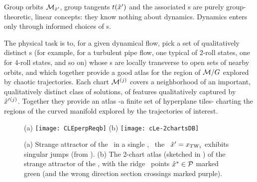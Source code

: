 \documentclass[aip,cha,reprint,
secnumarabic,
nofootinbib, tightenlines,
nobibnotes, showkeys, showpacs,
]{revtex4-1}
\begin{document}
{Group orbits ${\cal M}_{{\hat{x}'}}$, group tangents $t({\hat{x}'})$ and the
associated \slice s are purely group-theoretic, linear concepts: they
know nothing about dynamics. Dynamics enters only through informed
choices of \template s.

The physical task is to, for a given dynamical flow, pick a set of
qualitatively distinct {\template s} (for example, for a turbulent pipe
flow, one typical of 2-roll states, one for 4-roll states, and so on)
whose \slice s  are locally transverse to open sets of nearby orbits, and
which together provide a good atlas for the region of ${\cal M}/G$
explored by chaotic trajectories. Each chart ${\cal M}{}^{(j)}$ covers a
neighborhood of an important, qualitatively distinct class of solutions,
of features qualitatively captured by \template\ ${\hat{x}'}{}^{(j)}$.
Together they provide an atlas -a finite set of hyperplane tiles-
charting the regions of the curved manifold explored by the trajectories
of interest.

\begin{figure}
 \begin{center}
(a) \texttt{[image: CLEperpReqb]}
(b) \texttt{[image: cLe-2chartsDB]}
 \end{center}
  \caption{\label{fig:cLe-2charts}
(a)
Strange attractor of the \cLe\ in a single \slice, \template\
the \reqv\ ${\hat{x}'} = x_{TW_{1}}$ exhibits singular jumps
(from \refref{SiCvi10}).
(b)
The 2-chart atlas (sketched in ) of the strange
attractor of the \cLe, with the ridge \PoincSec\ points
$\hat{x}^* \in {\cal P}$ marked green (and the wrong direction section
crossings marked purple).
  }
\end{figure}


}
\end{document}

